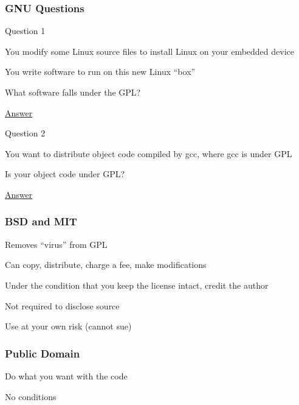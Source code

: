 \documentclass[t,12pt,numbers,fleqn]{beamer}
\begin{document}
\begin{frame}
\frametitle{GNU Questions}

\bi
\item Question 1
\bi
\item You modify some Linux source files to install Linux on your embedded
  device
\item You write software to run on this new Linux ``box''
\item What software falls under the GPL?
\item \href{http://www.softwarefreedom.org/resources/2008/compliance-guide.html}{Answer}
\ei
\item Question 2
\bi
\item You want to distribute object code compiled by gcc, where gcc is under GPL
\item Is your object code under GPL?
\item \href{https://www.gnu.org/licenses/gcc-exception-3.1-faq.en.html}{Answer}
\ei
\ei

\end{frame}


\begin{frame}
\frametitle{BSD and MIT}

\bi
\item Removes ``virus'' from GPL
\item Can copy, distribute, charge a fee, make modifications
\item Under the condition that you keep the license intact, credit the author
\item Not required to disclose source 
\item Use at your own risk (cannot sue)
\ei

\end{frame}


\begin{frame}
\frametitle{Public Domain}

\bi
\item Do what you want with the code
\item No conditions
\ei

\end{frame}

\end{document}
